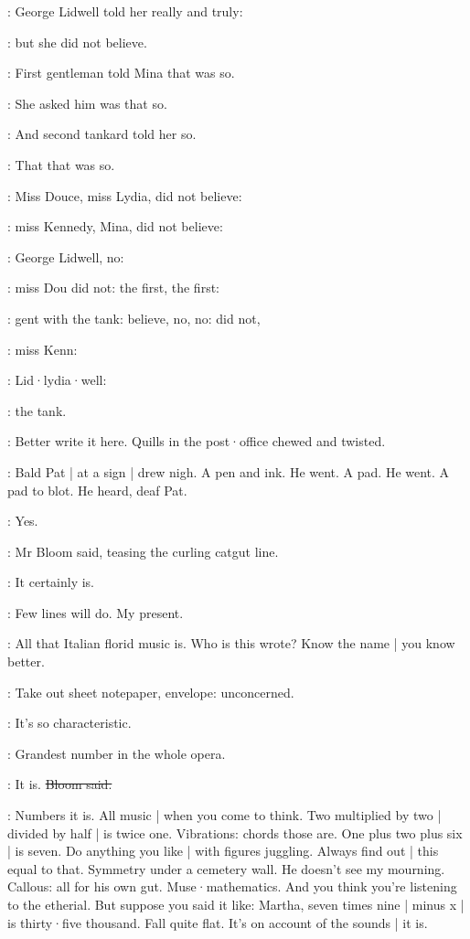 :
George Lidwell told her really and truly:

:
but she did not believe.

:
First gentleman told Mina that was so.

:
She asked him was that so.

:
And second tankard told her so.

:
That that was so.

:
Miss Douce,
miss Lydia,
did not believe:

:
miss Kennedy,
Mina,
did not believe:

:
George Lidwell,
no:

:
miss Dou did not:
the first,
the first:

:
gent with the tank:
believe,
no, no:
did not,

:
miss Kenn:

:
Lid·lydia·well:

:
the tank.

\BloomInt:
Better write it here.
Quills in the post·office chewed and twisted.

:
Bald Pat |
at a sign |
drew nigh.
A pen and ink.
He went.
A pad.
He went.
A pad to blot.
He heard,
deaf Pat.

\Bloom:
Yes.

:
Mr Bloom said,
teasing the curling catgut line.

\Bloom:
It certainly is.

\BloomInt:
Few lines will do.
My present.

\Bloom:
All that Italian florid music is.
Who is this wrote?
Know the name |
you know better.

\BloomInt:
Take out
sheet notepaper,
envelope:
unconcerned.

\Bloom:
It's so characteristic.

\goulding:
Grandest number in the whole opera.

\Bloom:
It is.
\sout{Bloom said.}

\BloomInt:
Numbers it is.
All music |
when you come to think.
Two multiplied by two |
divided by half |
is twice one.
Vibrations:
chords those are.
One plus two plus six |
is seven.
Do anything you like |
with figures juggling.
Always find out |
this equal to that.
Symmetry under a cemetery wall.
He doesn't see my mourning.
Callous:
all for his own gut.
Muse·mathematics.
And you think you're listening to the etherial.
But suppose you said it like:
Martha,
seven times nine |
minus x |
is thirty·five thousand.
Fall quite flat.
It's on account of the sounds |
it is.

